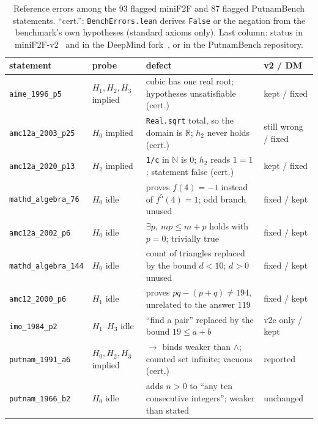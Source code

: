 \documentclass[10pt]{article}
\theoremstyle{definition}
\begin{document}
\begin{table}[t]
\centering\footnotesize
\begin{tabular}{llp{7.4cm}l}
\toprule
statement & probe & defect & v2 / DM\\
\midrule
\texttt{aime\_1996\_p5} & $H_1,H_2,H_3$ implied & cubic has one real root; hypotheses unsatisfiable (cert.) & kept / fixed\\
\texttt{amc12a\_2003\_p25} & $H_0$ implied & \texttt{Real.sqrt} total, so the domain is $\mathbb R$; $h_2$ never holds (cert.) & still wrong / fixed\\
\texttt{amc12a\_2020\_p13} & $H_2$ implied & \texttt{1/c} in $\mathbb N$ is $0$; $h_2$ reads $1=1$; statement false (cert.) & kept / fixed\\
\texttt{mathd\_algebra\_76} & $H_0$ idle & proves $f(4)=-1$ instead of $f^{5}(4)=1$; odd branch unused & fixed / kept\\
\texttt{amc12a\_2002\_p6} & $H_0$ idle & $\exists p,\ mp\le m+p$ holds with $p=0$; trivially true & fixed / kept\\
\texttt{mathd\_algebra\_144} & $H_0$ idle & count of triangles replaced by the bound $d<10$; $d>0$ unused & fixed / kept\\
\texttt{amc12\_2000\_p6} & $H_1$ idle & proves $pq-(p+q)\ne194$, unrelated to the answer $119$ & fixed / kept\\
\texttt{imo\_1984\_p2} & $H_1$--$H_3$ idle & ``find a pair'' replaced by the bound $19\le a+b$ & v2c only / kept\\
\midrule
\texttt{putnam\_1991\_a6} & $H_0,H_2,H_3$ implied & $\to$ binds weaker than $\wedge$; counted set infinite; vacuous (cert.) & reported\\
\texttt{putnam\_1966\_b2} & $H_0$ idle & adds $n>0$ to ``any ten consecutive integers''; weaker than stated & unchanged\\
\bottomrule
\end{tabular}
\caption{Reference errors among the 93 flagged miniF2F and 87 flagged PutnamBench statements.
``cert.'': \texttt{BenchErrors.lean} derives \texttt{False} or the negation from the benchmark's
own hypotheses (standard axioms only). Last column: status in miniF2F-v2~\cite{minif2fv2} and in
the DeepMind fork~\cite{minif2fdm}, or in the PutnamBench repository.}
\label{tab:bench}
\end{table}
\end{document}
